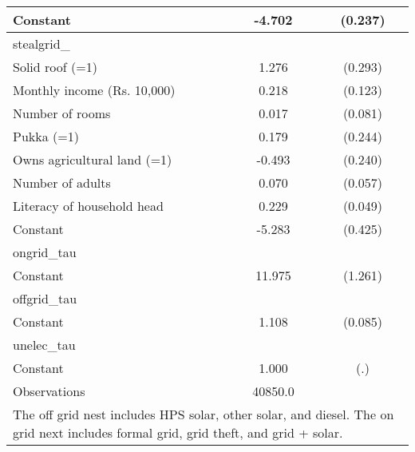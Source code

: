 \begin{table}[htbp]
{\begin{tabular}{l*{1}{cc}}
Constant            &      -4.702\sym{***}&     (0.237)\\
\midrule
stealgrid\_          &                     &            \\
Solid roof (=1)     &       1.276\sym{***}&     (0.293)\\
Monthly income (Rs. 10,000)&       0.218\sym{*}  &     (0.123)\\
Number of rooms     &       0.017         &     (0.081)\\
Pukka (=1)          &       0.179         &     (0.244)\\
Owns agricultural land (=1)&      -0.493\sym{**} &     (0.240)\\
Number of adults    &       0.070         &     (0.057)\\
Literacy of household head&       0.229\sym{***}&     (0.049)\\
Constant            &      -5.283\sym{***}&     (0.425)\\
\midrule
ongrid\_tau          &                     &            \\
Constant            &      11.975\sym{***}&     (1.261)\\
\midrule
offgrid\_tau         &                     &            \\
Constant            &       1.108\sym{***}&     (0.085)\\
\midrule
unelec\_tau          &                     &            \\
Constant            &       1.000         &         (.)\\
\midrule
Observations        &     40850.0         &            \\
\bottomrule
\multicolumn{3}{l}{\footnotesize The off grid nest includes HPS solar, other solar, and diesel.                 The on grid next includes formal grid, grid theft, and grid + solar.}\\
\end{tabular}}
\end{table}
